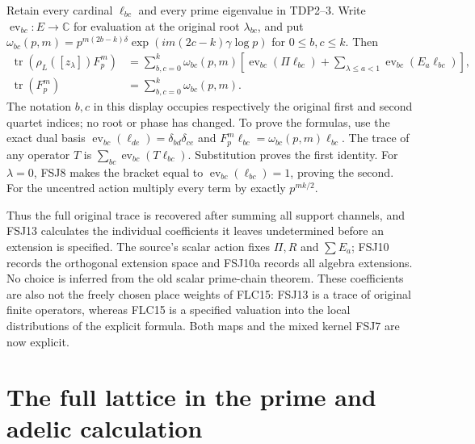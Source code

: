 \documentclass[11pt]{article}
\begin{document}
Retain every cardinal $\ell_{bc}$ and every prime eigenvalue in
TDP2--3. Write $\operatorname{ev}_{bc}:E\to\mathbb C$ for evaluation
at the original root $\lambda_{bc}$, and put
$\omega_{bc}(p,m)=p^{m(2b-k)\delta}
\exp(im(2c-k)\gamma\log p)$ for $0\le b,c\le k$.
Then
\[
\begin{split}
\operatorname{tr}(\rho_L([z_\lambda])F_p^m)
 &=\sum_{b,c=0}^k\omega_{bc}(p,m)
 \left[\operatorname{ev}_{bc}(\Pi\ell_{bc})
 +\sum_{\lambda\le a<1}\operatorname{ev}_{bc}(E_a\ell_{bc})\right],\\
\operatorname{tr}(F_p^m)&=\sum_{b,c=0}^k\omega_{bc}(p,m).
\end{split}
\tag{FSJ13}
\]
The notation $b,c$ in this display occupies respectively the original
first and second quartet indices; no root or phase has changed.
To prove the formulas, use the exact dual basis
$\operatorname{ev}_{bc}(\ell_{de})=\delta_{bd}\delta_{ce}$ and
$F_p^m\ell_{bc}=\omega_{bc}(p,m)\ell_{bc}$. The trace of any operator
$T$ is $\sum_{bc}\operatorname{ev}_{bc}(T\ell_{bc})$. Substitution
proves the first identity. For $\lambda=0$, FSJ8 makes the bracket
equal to $\operatorname{ev}_{bc}(\ell_{bc})=1$, proving the second.
For the uncentred action multiply every term by exactly $p^{mk/2}$.

Thus the full original trace is recovered after summing all support
channels, and FSJ13 calculates the individual coefficients it leaves
undetermined before an extension is specified. The source's scalar
action fixes $\Pi,R$ and $\sum E_a$; FSJ10 records the orthogonal
extension space and FSJ10a records all algebra extensions. No choice is
inferred from the old scalar prime-chain theorem. These coefficients
are also not the freely chosen place weights of FLC15: FSJ13 is a
trace of original finite operators, whereas FLC15 is a specified
valuation into the local distributions of the explicit formula.
Both maps and the mixed kernel FSJ7 are now explicit.



\section{The full lattice in the prime and adelic calculation}
\label{sec:full-lattice-connes}
\end{document}
